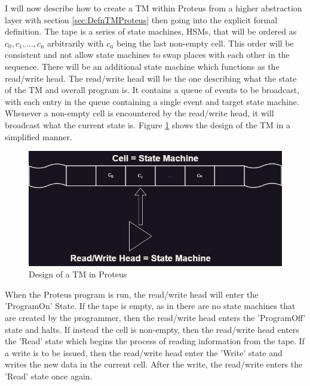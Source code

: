 I will now describe how to create a TM within Proteus from a higher abstraction layer with section \ref{sec:DefnTMProteus} then going into the explicit formal definition.
The tape is a series of state machines, HSMs, that will be ordered as $c_{0}, c_{1}, \dots , c_{\text{n}}$ arbitrarily with $c_{\text{n}}$ being the last non-empty cell.
This order will be consistent and not allow state machines to swap places with each other in the sequence.
There will be an additional state machine which functions as the read/write head.
The read/write head will be the one describing what the state of the TM and overall program is.
It contains a queue of events to be broadcast, with each entry in the queue containing a single event and target state machine.
Whenever a non-empty cell is encountered by the read/write head, it will broadcast what the current state is.
Figure \ref{fig:ProteusTMDesign} shows the design of the TM in a simplified manner.

\begin{figure}[h!]
    \centering
    \includegraphics[width=16cm]{images/ProteusTMDesign.png}
       \caption{Design of a TM in Proteus}
           \label{fig:ProteusTMDesign}
\end{figure}

When the Proteus program is run, the read/write head will enter the 'ProgramOn' State.
If the tape is empty, as in there are no state machines that are created by the programmer, then the read/write head enters the 'ProgramOff' state and halts.
If instead the cell is non-empty, then the read/write head enters the 'Read' state which begins the process of reading information from the tape.
If a write is to be issued, then the read/write head enter the 'Write' state and writes the new data in the current cell.
After the write, the read/write enters the 'Read' state once again.

